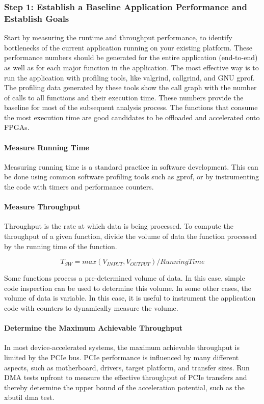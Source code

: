 \subsubsection{Step 1: Establish a Baseline Application Performance and Establish Goals}
Start by measuring the runtime and throughput performance, to identify bottlenecks of the current application running on your existing platform. These performance numbers should be generated for the entire application (end-to-end) as well as for each major function in the application. The most effective way is to run the application with profiling tools, like valgrind, callgrind, and GNU gprof. The profiling data generated by these tools show the call graph with the number of calls to all functions and their execution time. These numbers provide the baseline for most of the subsequent analysis process. The functions that consume the most execution time are good candidates to be offloaded and accelerated onto FPGAs.

\paragraph{Measure Running Time}
Measuring running time is a standard practice in software development. This can be done using common software profiling tools such as gprof, or by instrumenting the code with timers and performance counters.

\paragraph{Measure Throughput}
Throughput is the rate at which data is being processed. To compute the throughput of a given function, divide the volume of data the function processed by the running time of the function.

\[ T_{SW} = max(V_{INPUT}, V_{OUTPUT}) / Running Time \]

Some functions process a pre-determined volume of data. In this case, simple code inspection can be used to determine this volume. In some other cases, the volume of data is variable. In this case, it is useful to instrument the application code with counters to dynamically measure the volume.

\paragraph{Determine the Maximum Achievable Throughput}
In most device-accelerated systems, the maximum achievable throughput is limited by the PCIe bus. PCIe performance is influenced by many different aspects, such as motherboard, drivers, target platform, and transfer sizes. Run DMA tests upfront to measure the effective throughput of PCIe transfers and thereby determine the upper bound of the acceleration potential, such as the xbutil dma test.


